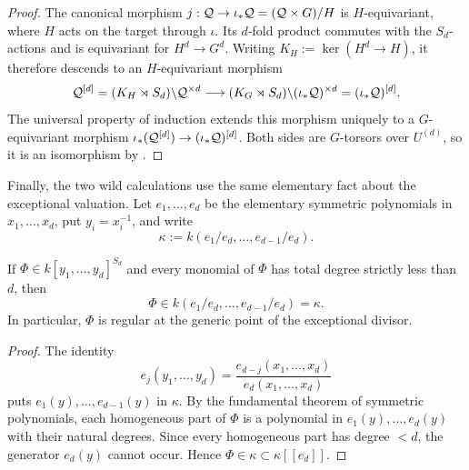 \begin{proof}
The canonical morphism
$j:\mathcal{Q}\to\iota_*\mathcal{Q}=(\mathcal{Q}\times G)/H$ is $H$-equivariant, where $H$ acts
on the target through $\iota$. Its $d$-fold product commutes with the
$S_d$-actions and is equivariant for $H^d\to G^d$. Writing
$K_H:=\ker(H^d\to H)$, it therefore descends to an $H$-equivariant morphism
\[
    \mathcal{Q}^{[d]}=(K_H\rtimes S_d)\backslash\mathcal{Q}^{\times d}
       \longrightarrow
    (K_{G}\rtimes S_d)\backslash(\iota_*\mathcal{Q})^{\times d}
       =(\iota_*\mathcal{Q})^{[d]}.
\]
The universal property of induction extends this morphism uniquely to a
$G$-equivariant morphism
$\iota_*(\mathcal{Q}^{[d]})\to(\iota_*\mathcal{Q})^{[d]}$. Both sides are $G$-torsors over
$U^{(d)}$, so it is an isomorphism by
.
\end{proof}

Finally, the two wild calculations use the same elementary fact about the
exceptional valuation. Let $e_1,\dots,e_d$ be the elementary symmetric
polynomials in $x_1,\dots,x_d$, put $y_i=x_i^{-1}$, and write
\[
    \kappa:=k(e_1/e_d,\dots,e_{d-1}/e_d).
\]

\begin{lemma}
\label{lemma:symmetric_regularity}
If $\Phi\in k[y_1,\dots,y_d]^{S_d}$ and every monomial of $\Phi$ has total
degree strictly less than $d$, then
\[
    \Phi\in k(e_1/e_d,\dots,e_{d-1}/e_d)=\kappa.
\]
In particular, $\Phi$ is regular at the generic point of the exceptional
divisor.
\end{lemma}

\begin{proof}
The identity
\[
    e_j(y_1,\dots,y_d)
       =\frac{e_{d-j}(x_1,\dots,x_d)}{e_d(x_1,\dots,x_d)}
\]
puts $e_1(y),\dots,e_{d-1}(y)$ in $\kappa$. By the fundamental theorem of
symmetric polynomials, each homogeneous part of $\Phi$ is a polynomial in
$e_1(y),\dots,e_d(y)$ with their natural degrees. Since every homogeneous
part has degree $<d$, the generator $e_d(y)$ cannot occur. Hence
$\Phi\in\kappa\subset\kappa[[e_d]]$.
\end{proof}
